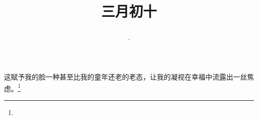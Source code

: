 \title{\date[d=18,m=4,y=2024][year:cn-y,年,month:cn,day:cn,日,·,weekday]·三月初十 }
这赋予我的脸一种甚至比我的童年还老的老态，让我的凝视在幸福中流露出一丝焦虑。\footnote{ }

